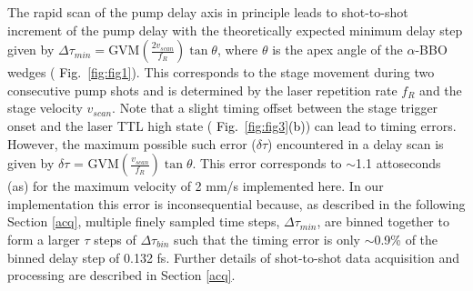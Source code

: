 \documentclass[%
aip,
amsmath,amssymb,
preprint,%
]{revtex4-2}
\newcommand*{\si}[1]{\textcolor{black}{ #1}}
\begin{document}
The rapid scan of the pump delay axis in principle leads to shot-to-shot increment of the pump delay with the theoretically expected minimum delay step given by $\Delta\tau_{min} = \text{GVM}(\frac{2v_{scan}}{f_R})\tan\theta$, where $\theta$ is the apex angle of the $\alpha$-BBO wedges (\si{Fig.~\ref{fig:fig1}}). This corresponds to the stage movement during two consecutive pump shots and is determined by the laser repetition rate $f_R$ and the stage velocity $v_{scan}$. Note that a slight timing offset between the stage trigger onset and the laser TTL high state (\si{Fig.~\ref{fig:fig3}(b)}) can lead to timing errors. However, the maximum possible such error ($\delta\tau$) encountered in a delay scan is given by $\delta\tau$  = $\text{GVM}(\frac{v_{scan}}{f_R})\tan\theta$. This error corresponds to  $\sim$1.1 attoseconds (as) for the maximum velocity of 2 mm/s implemented here. In our implementation this error is inconsequential because, as described in the following Section \ref{acq}, multiple finely sampled time steps, $\Delta\tau_{min}$, are binned together to form a larger $\tau$ steps of $\Delta\tau_{bin}$ such that the timing error is only $\sim$0.9\% of the binned delay step of 0.132 fs. Further details of shot-to-shot data acquisition and processing are described in Section \ref{acq}. 
\end{document}
